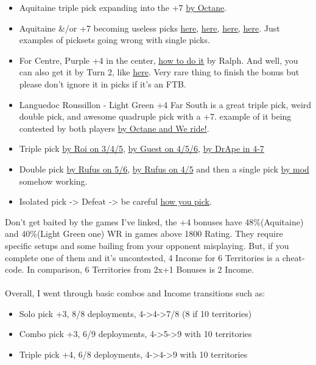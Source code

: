 \begin{itemize}
\begin{enumerate}
    \end{enumerate}
   \item Aquitaine triple pick expanding into the +7 \href{https://www.warzone.com/MultiPlayer?GameID=33443166}{by Octane}.
   \item Aquitaine \&/or +7 becoming useless picks \href{https://www.warzone.com/MultiPlayer?GameID=14429415}{here}, \href{https://www.warzone.com/MultiPlayer?GameID=25537788}{here}, \href{https://www.warzone.com/MultiPlayer?GameID=34470203}{here}, \href{https://www.warzone.com/MultiPlayer?GameID=36893709}{here}. Just examples of picksets going wrong with single picks.
   \item For Centre, Purple +4 in the center, \href{https://www.warzone.com/MultiPlayer?GameID=27743610}{how to do it} by Ralph. And well, you can also get it by Turn 2, like \href{https://www.warzone.com/MultiPlayer?GameID=41393844}{here}. Very rare thing to finish the bonus but please don't ignore it in picks if it's an FTB. 
   \item Languedoc Roussillon - Light Green +4 Far South is a great triple pick, weird double pick, and awesome quadruple pick with a +7. example of it being contested by both players \href{https://www.warzone.com/MultiPlayer?GameID=32881674}{by Octane and We ride!}.
   \item Triple pick \href{https://www.warzone.com/MultiPlayer?GameID=28112223}{by Roi on 3/4/5}, \href{https://www.warzone.com/MultiPlayer?GameID=27829090}{by Guest on 4/5/6}, \href{https://www.warzone.com/MultiPlayer?GameID=24276469}{by DrApe in 4-7}
   \item Double pick \href{https://www.warzone.com/MultiPlayer?GameID=22632740}{by Rufus on 5/6}, \href{https://www.warzone.com/MultiPlayer?GameID=14530998}{by Rufus on 4/5} and then a single pick \href{https://www.warzone.com/MultiPlayer?GameID=14514975}{by mod} somehow working.
   \item Isolated pick -> Defeat -> be careful \href{https://www.warzone.com/MultiPlayer?GameID=31721614}{how you pick}.
\end{itemize}

Don't get baited by the games I've linked, the +4 bonuses have 48\%(Aquitaine) and 40\%(Light Green one) WR in games above 1800 Rating. They require specific setups and some bailing from your opponent misplaying. But, if you complete one of them and it's uncontested, 4 Income for 6 Territories is a cheat-code. In comparison, 6 Territories from 2x+1 Bonuses is 2 Income. 
\\
\\
Overall, I went through basic combos and Income transitions such as:
\begin{itemize}
    \item Solo pick +3, 8/8 deployments, 4->4->7/8 (8 if 10 territories)
    \item Combo pick +3, 6/9 deployments, 4->5->9 with 10 territories
    \item Triple pick +4, 6/8 deployments, 4->4->9 with 10 territories
\end{itemize}

